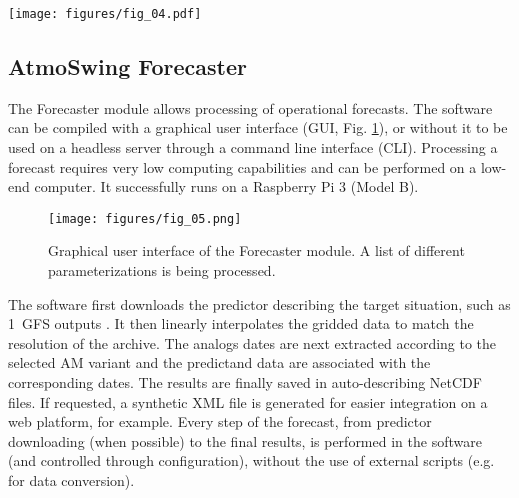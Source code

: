 \documentclass[review]{elsarticle}
\begin{document}
\begin{figure*}[hbt!]
	\texttt{[image: figures/fig\_04.pdf]}
	\caption{Simplified illustration of the main classes or objects involved in the core of the AM processing in AtmoSwing. The processor class interacts with parent classes that can represent different entities, such as different reanalysis datasets, predictand, criteria, scores, and in different contexts: calibration, forecasting, and downscaling. The items in green are only available in the Optimizer, the ones in blue, in the Forecaster, and the ones in Orange, in the Downscaler. The area represents the spatial window and the time array a list of candidate dates (from preselection or previous analogy levels). The links to the parameters illustrate the dynamic definition of the different types by the parameters from the XML file.}
	\label{figure:code_diagram}
\end{figure*}


\subsection{AtmoSwing Forecaster}
\label{sec:forecaster}

The Forecaster module allows processing of operational forecasts. The software can be compiled with a graphical user interface (GUI, Fig. \ref{figure:atmoswing-forecaster-gui}), or without it to be used on a headless server through a command line interface (CLI). Processing a forecast requires very low computing capabilities and can be performed on a low-end computer. It successfully runs on a Raspberry Pi 3 (Model B).

\begin{figure}[hbt!]
	\texttt{[image: figures/fig\_05.png]}
	\caption{Graphical user interface of the Forecaster module. A list of different parameterizations is being processed.}
	\label{figure:atmoswing-forecaster-gui}
\end{figure}

The software first downloads the predictor describing the target situation, such as 1\degree\ GFS outputs \citep[Global Forecast System,][see Sect. \ref{sec:data}]{Kanamitsu1991,Kanamitsu1989}. It then linearly interpolates the gridded data to match the resolution of the archive. The analogs dates are next extracted according to the selected AM variant and the predictand data are associated with the corresponding dates. The results are finally saved in auto-describing NetCDF files. If requested, a synthetic XML file is generated for easier integration on a web platform, for example. Every step of the forecast, from predictor downloading (when possible) to the final results, is performed in the software (and controlled through configuration), without the use of external scripts (e.g. for data conversion).
\end{document}
